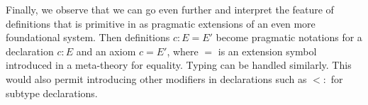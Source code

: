   Finally, we observe that we can go even further and interpret the feature of definitions that is primitive in {\mmt} as pragmatic
  extensions of an even more foundational system. Then definitions $c:E=E'$ become pragmatic notations
  for a declaration $c:E$ and an axiom $c=E'$, where $=$ is an extension symbol introduced in a meta-theory for equality.
  Typing can be handled similarly. This would also permit introducing other modifiers in declarations such as $<:$ for subtype declarations.


